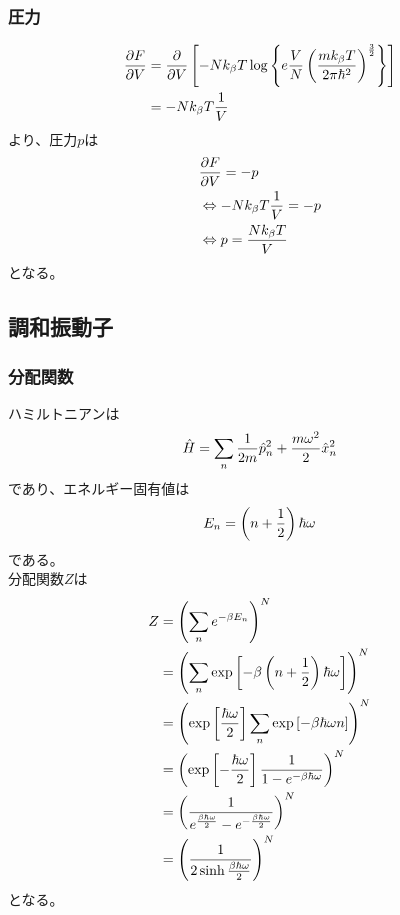 \documentclass[dvipdfmx, 11pt, a4paper]{jsarticle}
\theoremstyle{definition}
\begin{document}
\subsubsection{圧力}
    \begin{align}
        \frac{\partial F}{\partial V} &= \frac{\partial }{\partial V} \left[ -Nk_\beta T \log \left\{ e\frac{V}{N} \left( \frac{mk_\beta T}{2\pi \hbar^2 } \right)^{\frac{3}{2}} \right\} \right] \notag \\
        &= -Nk_\beta T \frac{1}{V}
    \end{align}
    より、圧力$p$は
    \begin{align}
        &\frac{\partial F}{\partial V} = -p \notag \\
        &\Leftrightarrow -Nk_\beta T \frac{1}{V} = -p \notag \\
        &\Leftrightarrow p = \frac{Nk_\beta T}{V}
    \end{align}
    となる。
\subsection{調和振動子}
\subsubsection{分配関数}
    ハミルトニアンは
    \begin{align}
        \hat{H} = \sum_n \frac{1}{2m}\hat{p}_n^2 + \frac{m\omega^2}{2} \hat{x}_n^2 \notag
    \end{align}
    であり、エネルギー固有値は
    \begin{align}
        E_n = \left( n + \frac{1}{2}\right)\hbar \omega \notag 
    \end{align}
    である。\\
    分配関数$Z$は
    \begin{align}
        Z &= \left( \sum_n e^{-\beta E_n} \right)^N \notag \\
        &= \left( \sum_n \exp \left[ -\beta \left( n + \frac{1}{2}\right)\hbar \omega \right] \right)^N \notag \\
        &= \left( \exp\left[ \frac{\hbar \omega}{2} \right] \sum_n \exp \left[ -\beta \hbar \omega n \right] \right)^N \notag \\
        &= \left( \exp\left[ -\frac{\hbar \omega}{2} \right] \frac{1}{1 - e^{-\beta \hbar \omega }} \right)^N \notag \\
        &= \left( \frac{1}{e^{\frac{\beta \hbar \omega}{2}} - e^{-\frac{\beta \hbar \omega}{2}}} \right)^N \notag \\
        &= \left( \frac{1}{2\sinh \frac{\beta \hbar \omega}{2}} \right)^N \notag 
    \end{align}
    となる。
\end{document}
